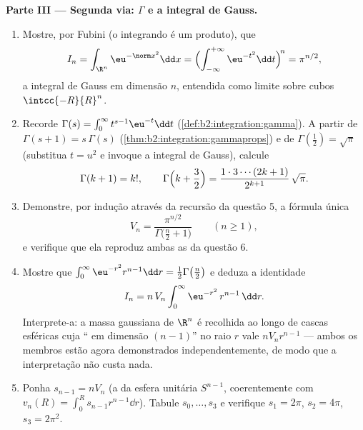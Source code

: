\begin{problem}[{Problema de fim de semana --- $V_n =
\pi^{n/2}/\Gamma(\frac n2 + 1)$, e a estranheza das
dimensões altas}]
\medskip
\noindent\textbf{Parte III --- Segunda via: $\Gamma$ e a
integral de Gauss.}
\begin{enumerate}[resume]
  \item Mostre, por Fubini (o integrando é um produto), que
        \[
        I_n = \int_{\R^n}\eu^{-\norm
        x^2}\dd x
        = \Bigl(\int_{-\infty}^{+\infty}
        \eu^{-t^2}\dd t\Bigr)^{\!n} = \pi^{n/2},
        \]
        a integral de Gauss em dimensão $n$, entendida como
        limite sobre cubos $\intcc{-R}{R}^n$.
  \item Recorde $\Gamma(s) = \int_0^\infty t^{s-1}\eu^{-t}\dd
        t$ (\cref{def:b2:integration:gamma}). A partir de
        $\Gamma(s+1) = s\,\Gamma(s)$
        (\cref{thm:b2:integration:gammaprops}) e de
        $\Gamma(\tfrac12) = \sqrt\pi$ (substitua $t = u^2$
        e invoque a integral de Gauss), calcule
        \[
        \Gamma(k + 1) = k!,
        \qquad
        \Gamma\Bigl(k + \frac32\Bigr) =
        \frac{1\cdot3\cdots(2k+1)}{2^{k+1}}\,\sqrt\pi .
        \]
  \item Demonstre, por indução através da recursão da questão
        5, a fórmula única
        \[
        V_n = \frac{\pi^{n/2}}{\Gamma\bigl(\frac n2 +
        1\bigr)} \qquad (n \geq 1),
        \]
        e verifique que ela reproduz ambas as  da questão
        6.
  \item Mostre que $\int_0^\infty \eu^{-r^2}r^{n-1}\dd r =
        \tfrac12\Gamma\bigl(\tfrac n2\bigr)$ e deduza a
        identidade
        \[
        I_n = n\,V_n\int_0^\infty \eu^{-r^2}\,r^{n-1}\,\dd r.
        \]
        Interprete-a: a massa gaussiana de $\R^n$ é
        recolhida ao longo de cascas esféricas cuja
        `` em dimensão $(n-1)$'' no raio $r$ vale
        $nV_nr^{n-1}$ --- ambos os membros estão agora demonstrados
        independentemente, de modo que a interpretação não custa nada.
  \item Ponha $s_{n-1} = nV_n$ (a  da esfera unitária
        $S^{n-1}$, coerentemente com $v_n(R) = \int_0^R
        s_{n-1}r^{n-1}\dd r$). Tabule $s_0, \dots, s_3$ e
        verifique $s_1 = 2\pi$, $s_2 = 4\pi$, $s_3 = 2\pi^2$.
\end{enumerate}


\end{problem}
